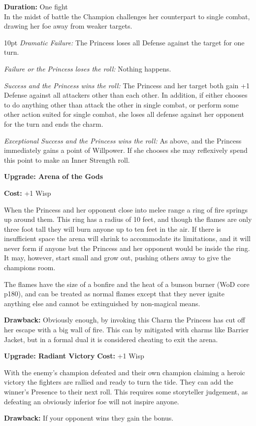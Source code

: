 \noindent \textbf{Duration:} One fight\\

\noindent In the midst of battle the Champion challenges her counterpart to single combat, drawing her foe away from weaker targets.

\begin{myindentpar}{10pt} 
\emph{Dramatic Failure:} The Princess loses all Defense against the target for one turn.

\emph{Failure or the Princess loses the roll:} Nothing happens.

\emph{Success and the Princess wins the roll:} The Princess and her target both gain +1 Defense against all attackers other than each other. In addition, if either chooses to do anything other than attack the other in single combat, or perform some other action suited for single combat, she loses all defense against her opponent for the turn and ends the charm.

\emph{Exceptional Success and the Princess wins the roll:} As above, and the Princess immediately gains a point of Willpower. If she chooses she may reflexively spend this point to make an Inner Strength roll.

\textbf{Upgrade: Arena of the Gods}

\textbf{Cost:} +1 Wisp

When the Princess and her opponent close into melee range a ring of fire springs up around them. This ring has a radius of 10 feet, and though the flames are only three foot tall they will burn anyone up to ten feet in the air. If there is insufficient space the arena will shrink to accommodate its limitations, and it will never form if anyone but the Princess and her opponent would be inside the ring. It may, however, start small and grow out, pushing others away to give the champions room.

The flames have the size of a bonfire and the heat of a bunson burner (WoD core p180), and can be treated as normal flames except that they never ignite anything else and cannot be extinguished by non-magical means.

\textbf{Drawback:} Obviously enough, by invoking this Charm the Princess has cut off her escape with a big wall of fire. This can by mitigated with charms like Barrier Jacket, but in a formal dual it is considered cheating to exit the arena.

\textbf{Upgrade: Radiant Victory}
\textbf{Cost:} +1 Wisp

With the enemy's champion defeated and their own champion claiming a heroic victory the fighters are rallied and ready to turn the tide. They can add the winner's Presence to their next roll. This requires some storyteller judgement, as defeating an obviously inferior foe will not inspire anyone. 

\textbf{Drawback:} If your opponent wins they gain the bonus.\end{myindentpar}

